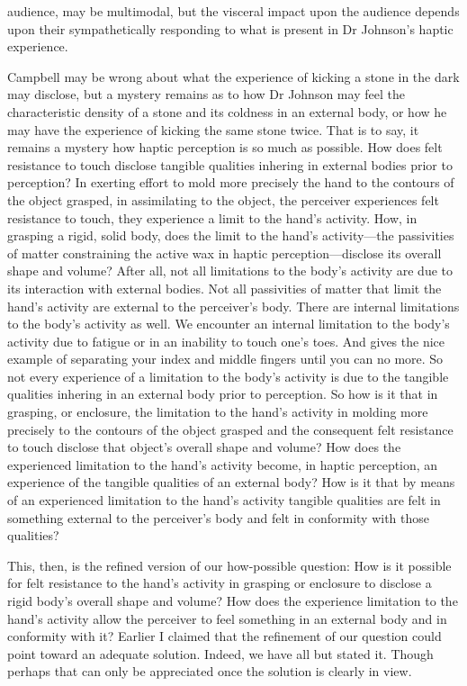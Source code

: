 audience, may be multimodal, but the visceral impact upon the audience depends upon their sympathetically responding to what is present in Dr Johnson's haptic experience.

Campbell may be wrong about what the experience of kicking a stone in the dark may disclose, but a mystery remains as to how Dr Johnson may feel the characteristic density of a stone and its coldness in an external body, or how he may have the experience of kicking the same stone twice. That is to say, it remains a mystery how haptic perception is so much as possible. How does felt resistance to touch disclose tangible qualities inhering in external bodies prior to perception? In exerting effort to mold more precisely the hand to the contours of the object grasped, in assimilating to the object, the perceiver experiences felt resistance to touch, they experience a limit to the hand's activity. How, in grasping a rigid, solid body, does the limit to the hand's activity---the passivities of matter constraining the active wax in haptic perception---disclose its overall shape and volume? After all, not all limitations to the body's activity are due to its interaction with external bodies. Not all passivities of matter that limit the hand's activity are external to the perceiver's body. There are internal limitations to the body's activity as well. We encounter an internal limitation to the body's activity due to fatigue or in an inability to touch one's toes. And \citet[154]{Smith:2002sa} gives the nice example of separating your index and middle fingers until you can no more. So not every experience of a limitation to the body's activity is due to the tangible qualities inhering in an external body prior to perception. So how is it that in grasping, or enclosure, the limitation to the hand's activity in molding more precisely to the contours of the object grasped and the consequent felt resistance to touch disclose that object's overall shape and volume? How does the experienced limitation to the hand's activity become, in haptic perception, an experience of the tangible qualities of an external body? How is it that by means of an experienced limitation to the hand's activity tangible qualities are felt in something external to the perceiver's body and felt in conformity with those qualities?

This, then, is the refined version of our how-possible question: How is it possible for felt resistance to the hand's activity in grasping or enclosure to disclose a rigid body's overall shape and volume? How does the experience limitation to the hand's activity allow the perceiver to feel something in an external body and in conformity with it? Earlier I claimed that the refinement of our question could point toward an adequate solution. Indeed, we have all but stated it. Though perhaps that can only be appreciated once the solution is clearly in view.



